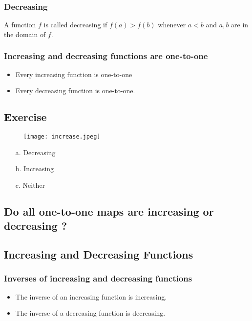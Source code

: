 \subsubsection{Decreasing}
A function \(f\) is called decreasing if \(f (a) >  f (b)\) whenever \(a < b\) and \(a, b \) are in
the domain of \(f\).

\subsubsection{Increasing and decreasing functions are one-to-one}
\begin{itemize}
  \item Every increasing function is one-to-one
  \item Every decreasing function is one-to-one.
\end{itemize}

\subsection{Exercise}
\begin{figure}
  \centering
  \texttt{[image: increase.jpeg]}
\end{figure}
\begin{enumerate}
  \item[a.] Decreasing
  \item[b.] Increasing
  \item[c.] Neither
\end{enumerate}

\subsection{Do all one-to-one maps are increasing or decreasing ?}

\subsection{Increasing and Decreasing Functions}
\subsubsection{Inverses of increasing and decreasing functions}
\begin{itemize}
  \item The inverse of an increasing function is increasing.
  \item The inverse of a decreasing function is decreasing.
\end{itemize}
